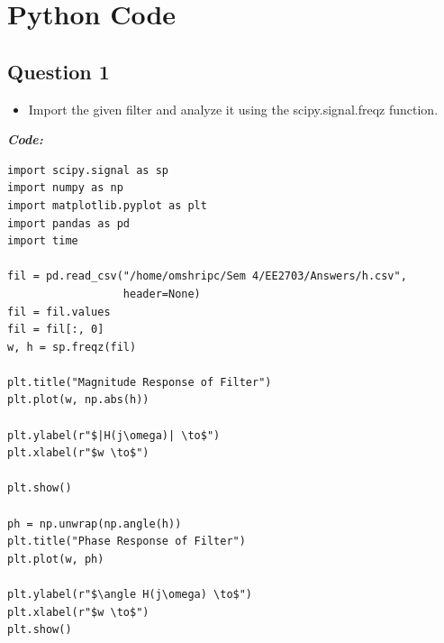 \documentclass[11pt, a4paper]{article}
\begin{document}
\section{Python Code}
\subsection{Question 1}
\begin{itemize}
  \item Import the given filter and analyze it using the scipy.signal.freqz function.
\end{itemize}


\textit{\textbf{Code:}}

\begin{lstlisting}
import scipy.signal as sp
import numpy as np
import matplotlib.pyplot as plt
import pandas as pd
import time 

fil = pd.read_csv("/home/omshripc/Sem 4/EE2703/Answers/h.csv",
                  header=None)
fil = fil.values
fil = fil[:, 0]
w, h = sp.freqz(fil)

plt.title("Magnitude Response of Filter")
plt.plot(w, np.abs(h))

plt.ylabel(r"$|H(j\omega)| \to$")
plt.xlabel(r"$w \to$")

plt.show()

ph = np.unwrap(np.angle(h))
plt.title("Phase Response of Filter")
plt.plot(w, ph)

plt.ylabel(r"$\angle H(j\omega) \to$")
plt.xlabel(r"$w \to$")
plt.show()

\end{lstlisting}
\end{document}
